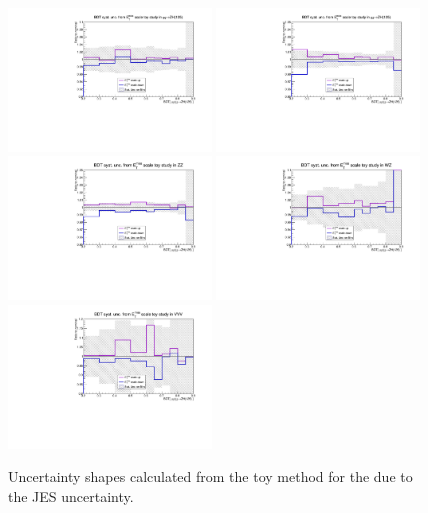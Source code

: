 \begin{figure}[htbp]
\begin{center}
\includegraphics[width=0.48\textwidth]{figures/syst_BDT_ZH_hinv_sm_toys_MET.pdf}
\includegraphics[width=0.48\textwidth]{figures/syst_BDT_ggZH_hinv_toys_MET.pdf}
\includegraphics[width=0.48\textwidth]{figures/syst_BDT_ZZ_toys_MET.pdf}
\includegraphics[width=0.48\textwidth]{figures/syst_BDT_WZ_toys_MET.pdf}
\includegraphics[width=0.48\textwidth]{figures/syst_BDT_VVV_toys_MET.pdf}
\caption{Uncertainty shapes calculated from the toy method for the \met due to the JES uncertainty.}
\label{fig:bdt_MET_scale}
\end{center}
\end{figure}


